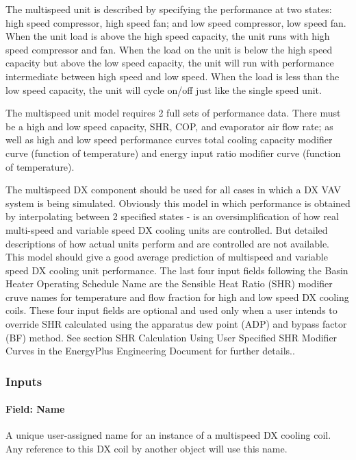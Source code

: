 The multispeed unit is described by specifying the performance at two states: high speed compressor, high speed fan; and low speed compressor, low speed fan. When the unit load is above the high speed capacity, the unit runs with high speed compressor and fan. When the load on the unit is below the high speed capacity but above the low speed capacity, the unit will run with performance intermediate between high speed and low speed. When the load is less than the low speed capacity, the unit will cycle on/off just like the single speed unit.

The multispeed unit model requires 2 full sets of performance data. There must be a high and low speed capacity, SHR, COP, and evaporator air flow rate; as well as high and low speed performance curves total cooling capacity modifier curve (function of temperature) and energy input ratio modifier curve (function of temperature).

The multispeed DX component should be used for all cases in which a DX VAV system is being simulated. Obviously this model in which performance is obtained by interpolating between 2 specified states - is an oversimplification of how real multi-speed and variable speed DX cooling units are controlled. But detailed descriptions of how actual units perform and are controlled are not available. This model should give a good average prediction of multispeed and variable speed DX cooling unit performance. The last four input fields following the Basin Heater Operating Schedule Name are the Sensible Heat Ratio (SHR) modifier cruve names for temperature and flow fraction for high and low speed DX cooling coils. These four input fields are optional and used only when a user intends to override SHR calculated using the apparatus dew point (ADP) and bypass factor (BF) method. See section SHR Calculation Using User Specified SHR Modifier Curves in the EnergyPlus Engineering Document for further details..

\subsubsection{Inputs}\label{inputs-14-004}

\paragraph{Field: Name}\label{field-name-13-003}

A unique user-assigned name for an instance of a multispeed DX cooling coil. Any reference to this DX coil by another object will use this name.

